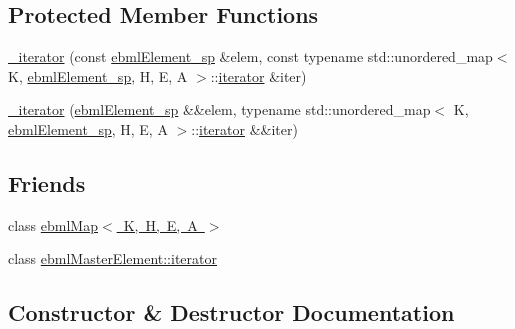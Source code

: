 \subsection*{Protected Member Functions}
\begin{DoxyCompactItemize}
\item 
\mbox{\hyperlink{classebml_1_1ebmlMap_1_1__iterator_afcab3ed0bb37c020c39a09098bc751a8}{\+\_\+iterator}} (const \mbox{\hyperlink{namespaceebml_adad533b7705a16bb360fe56380c5e7be}{ebml\+Element\+\_\+sp}} \&elem, const typename std\+::unordered\+\_\+map$<$ K, \mbox{\hyperlink{namespaceebml_adad533b7705a16bb360fe56380c5e7be}{ebml\+Element\+\_\+sp}}, H, E, A $>$\+::\mbox{\hyperlink{classebml_1_1ebmlMasterElement_1_1iterator}{iterator}} \&iter)
\item 
\mbox{\hyperlink{classebml_1_1ebmlMap_1_1__iterator_a0664de1ae97c95b30c3b08b40c4b8b6e}{\+\_\+iterator}} (\mbox{\hyperlink{namespaceebml_adad533b7705a16bb360fe56380c5e7be}{ebml\+Element\+\_\+sp}} \&\&elem, typename std\+::unordered\+\_\+map$<$ K, \mbox{\hyperlink{namespaceebml_adad533b7705a16bb360fe56380c5e7be}{ebml\+Element\+\_\+sp}}, H, E, A $>$\+::\mbox{\hyperlink{classebml_1_1ebmlMasterElement_1_1iterator}{iterator}} \&\&iter)
\end{DoxyCompactItemize}
\subsection*{Friends}
\begin{DoxyCompactItemize}
\item 
class \mbox{\hyperlink{classebml_1_1ebmlMap_1_1__iterator_a691e480013452ea48661a61746fd1b5c}{ebml\+Map$<$ K, H, E, A $>$}}
\item 
class \mbox{\hyperlink{classebml_1_1ebmlMap_1_1__iterator_a7f678a46134f738b99dfff4aafa7fc5f}{ebml\+Master\+Element\+::iterator}}
\end{DoxyCompactItemize}


\subsection{Constructor \& Destructor Documentation}
\mbox{\label{classebml_1_1ebmlMap_1_1__iterator_afcab3ed0bb37c020c39a09098bc751a8}} 
